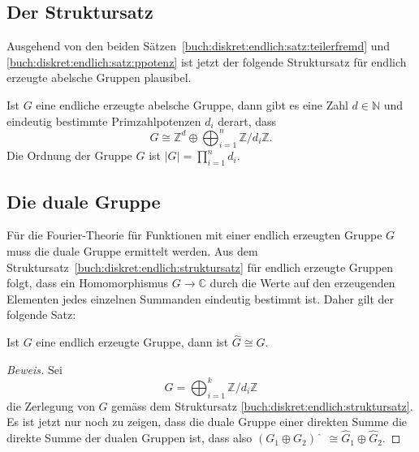 %
%
\subsection{Der Struktursatz
\label{buch:diskret:endlich:subsection:}}
Ausgehend von den beiden Sätzen~\ref{buch:diskret:endlich:satz:teilerfremd}
und
\ref{buch:diskret:endlich:satz:ppotenz}
ist jetzt der folgende Struktursatz für endlich erzeugte abelsche
Gruppen plausibel.

\begin{satz}
\label{buch:diskret:endlich:struktursatz}
Ist $G$ eine endliche erzeugte abelsche Gruppe, dann gibt es eine
Zahl $d\in\mathbb{N}$ und eindeutig bestimmte Primzahlpotenzen $d_i$
derart, dass
\[
G
\cong
\mathbb{Z}^d
\oplus
\bigoplus_{i=1}^n
\mathbb{Z}/d_i\mathbb{Z}.
\]
Die Ordnung der Gruppe $G$ ist $|G|=\prod_{i=1}^n d_i$.
\end{satz}

%
%
\subsection{Die duale Gruppe
\label{buch:diskret:endlich:subsection:dual}}
Für die Fourier-Theorie für Funktionen mit einer endlich erzeugten
Gruppe $G$ muss die duale Gruppe ermittelt werden.
Aus dem Struktursatz~\ref{buch:diskret:endlich:struktursatz}
für endlich erzeugte Gruppen folgt, dass ein Homomorphismus
$G\to\mathbb{C}$ durch die Werte auf den erzeugenden Elementen
jedes einzelnen Summanden eindeutig bestimmt ist.
Daher gilt der folgende Satz:

\begin{satz}
Ist $G$ eine endlich erzeugte Gruppe, dann ist
$\hat{G}\cong G$.
\end{satz}

\begin{proof}[Beweis]
Sei
\[
G
=
\bigoplus_{i=1}^k \mathbb{Z}/d_i\mathbb{Z}
\]
die Zerlegung von $G$ gemäss dem Struktursatz
\ref{buch:diskret:endlich:struktursatz}.
Es ist jetzt nur noch zu zeigen, dass die duale Gruppe einer direkten
Summe die direkte Summe der dualen Gruppen ist, dass also
$(G_1\oplus G_2)\hat{\phantom{\imath}} \cong \hat{G}_1\oplus \hat{G}_2$.
\end{proof}



